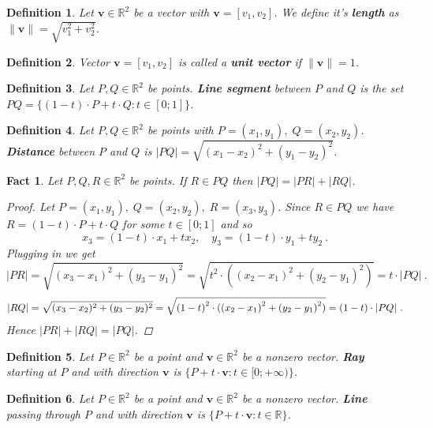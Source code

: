 \documentclass[a4paper,12pt]{report}
\newtheorem{definition}{Definition}
\newtheorem{fact}{Fact}
\begin{document}
\begin{definition}
  Let $\mathbf{v}\in\mathbb{R}^2$ be a vector with $\mathbf{v}=[v_1,v_2]$. We define it's  \textbf{length} as $\|\mathbf{v}\|=\sqrt{v_1^2+v_2^2}$.
\end{definition}

\begin{definition}
  Vector $\mathbf{v}=[v_1,v_2]$ is called a \textbf{unit vector} if $\|\mathbf{v}\|=1$.
\end{definition}

\begin{definition}
  Let $P,Q\in\mathbb{R}^2$ be points. \textbf{Line segment} between $P$ and $Q$ is the set $PQ=\{(1-t)\cdot P+t\cdot Q:t\in[0;1]\}$.
\end{definition}

\begin{definition}
  Let $P,Q\in\mathbb{R}^2$ be points with $P=(x_1,y_1),\; Q=(x_2,y_2)$. \textbf{Distance} between $P$ and $Q$ is $|PQ|=\sqrt{{(x_1-x_2)}^2+{(y_1-y_2)}^2}$.
\end{definition}

\begin{fact}\label{Distance Addition}
  Let $P,Q,R\in\mathbb{R}^2$ be points. If $R\in PQ$ then $|PQ|=|PR|+|RQ|$.
\begin{proof}
  Let $P=(x_1,y_1),\; Q=(x_2,y_2),\; R=(x_3,y_3)$. Since $R\in PQ$ we have $R=(1-t)\cdot P+t\cdot Q$ for some $t\in[0;1]$ and so 
  \[
    x_3=(1-t)\cdot x_1+tx_2, \quad y_3=(1-t)\cdot y_1+ty_2 ~.
  \]
  Plugging in we get
  \[
    |PR|=\sqrt{(x_3-x_1)^2+(y_3-y_1)^2}=\sqrt{t^2\cdot ({(x_2-x_1)}^2+{(y_2-y_1)}^2)}=t\cdot |PQ| ~.
  \]
  \[
    |RQ|=\sqrt{(x_3-x_2)^2+(y_3-y_2)^2}=\sqrt{{(1-t)}^2\cdot ({(x_2-x_1)}^2+{(y_2-y_1)}^2)} \\
    =(1-t)\cdot |PQ| ~.
  \]
  Hence $|PR|+|RQ|=|PQ|$.
\end{proof}
\end{fact}

\begin{definition}
  Let $P\in\mathbb{R}^2$ be a point and $\mathbf{v}\in\mathbb{R}^2$ be a nonzero vector. \textbf{Ray} starting at $P$ and with direction $\mathbf{v}$ is $\{P+t\cdot\mathbf{v}:t\in[0;+\infty)\}$.
\end{definition}

\begin{definition}
  Let $P\in\mathbb{R}^2$ be a point and $\mathbf{v}\in\mathbb{R}^2$ be a nonzero vector. \textbf{Line} passing through $P$ and with direction $\mathbf{v}$ is $\{P+t\cdot\mathbf{v}:t\in \mathbb{R}\}$.
\end{definition}
\end{document}
